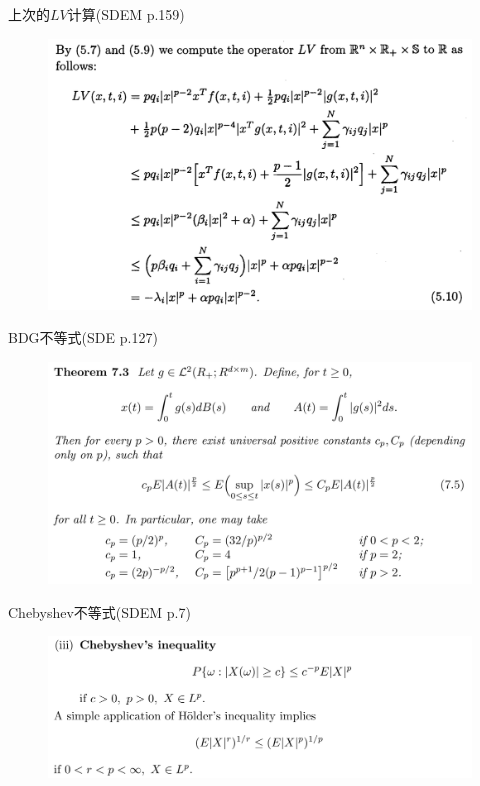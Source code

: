 \documentclass[10pt,aspectratio=43]{beamer}
\begin{document}
\begin{frame}{上次的$ LV $计算(SDEM p.159)}
\begin{figure}
\centering
\includegraphics[width=\linewidth]{1}
\end{figure}
\end{frame}

\begin{frame}{BDG不等式(SDE p.127)}
\begin{figure}
\centering
\includegraphics[width=\linewidth]{2}
\end{figure}
\end{frame}

\begin{frame}{Chebyshev不等式(SDEM p.7)}
\begin{figure}
\centering
\includegraphics[width=\linewidth]{3}
\end{figure}
\end{frame}
\end{document}
